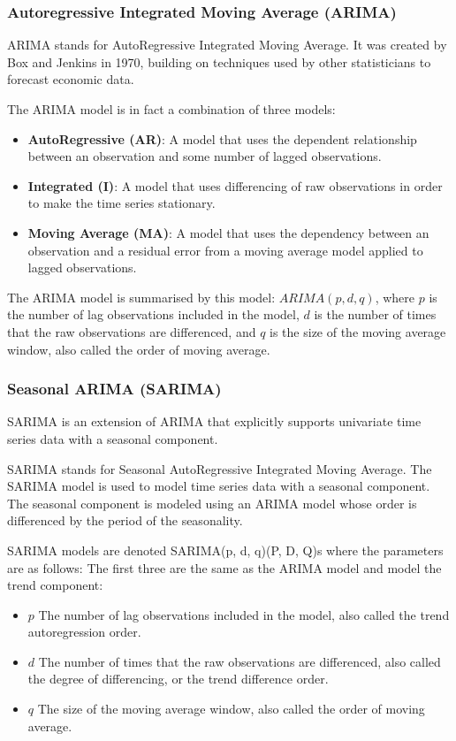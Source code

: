 \documentclass[manuscript,screen,nonacm,11pt]{acmart}                                                          %
\numberwithin{equation}{section}
\begin{document}
\subsubsection{Autoregressive Integrated Moving Average (ARIMA)}
ARIMA stands for AutoRegressive Integrated Moving Average. It was created by Box and Jenkins 
in 1970, building on techniques used by other statisticians to forecast economic data.

The ARIMA model is in fact a combination of three models:
\begin{itemize}
\item \textbf{AutoRegressive (AR)}: A model that uses the dependent relationship between an observation and some number of lagged observations.
\item \textbf{Integrated (I)}: A model that uses differencing of raw observations in order to make the time series stationary.
\item \textbf{Moving Average (MA)}: A model that uses the dependency between an observation and a residual error from a moving average model applied to lagged observations.
\end{itemize} 

The ARIMA model is summarised by this model: $ARIMA(p,d,q)$, where $p$ is the number of lag observations included in the model, $d$ is the number of times that the raw observations are differenced, and $q$ is the size of the moving average window, also called the order of moving average.

\subsubsection{Seasonal ARIMA (SARIMA)}
SARIMA is an extension of ARIMA that explicitly supports univariate time series data with a seasonal component.

SARIMA stands for Seasonal AutoRegressive Integrated Moving Average.
The SARIMA model is used to model time series data with a seasonal component. 
The seasonal component is modeled using an ARIMA model whose order is differenced 
by the period of the seasonality.

SARIMA models are denoted SARIMA(p, d, q)(P, D, Q)s where the parameters are as 
follows:
The first three are the same as the ARIMA model and model the trend component:
\begin{itemize}
\item $p$ The number of lag observations included in the model, also 
called the trend autoregression order.
\item $d$ The number of times that the raw observations are differenced, also 
called the degree of differencing, or the trend difference order.
\item $q$ The size of the moving average window, also called the order of moving average.
\end{itemize}
\end{document}
